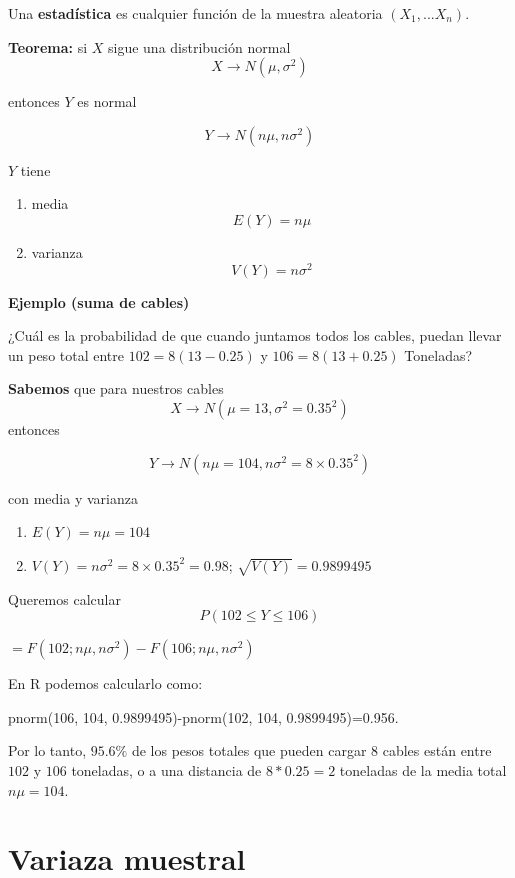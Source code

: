 \documentclass[
]{book}
\providecommand{\tightlist}{%
  \setlength{\itemsep}{0pt}\setlength{\parskip}{0pt}}
\begin{document}
Una \textbf{estadística} es cualquier función de la muestra aleatoria \((X_1, ... X_n)\).

\textbf{Teorema:} si \(X\) sigue una distribución normal
\[X \rightarrow N(\mu, \sigma^2)\]

entonces \(Y\) es normal

\[Y \rightarrow N(n\mu, n\sigma^2)\]

\(Y\) tiene

\begin{enumerate}
\def\labelenumi{\arabic{enumi})}
\tightlist
\item
  media \[E(Y)=n\mu\]
\item
  varianza \[V(Y)=n\sigma^2\]
\end{enumerate}

\textbf{Ejemplo (suma de cables)}

¿Cuál es la probabilidad de que cuando juntamos todos los cables, puedan llevar un peso total entre \(102=8(13 - 0.25)\) y \(106=8(13+ 0.25)\) Toneladas?

\textbf{Sabemos} que para nuestros cables \[X \rightarrow N(\mu=13, \sigma^2=0.35^2)\] entonces

\[Y \rightarrow N(n\mu=104, n\sigma^2=8\times 0.35^2)\]

con media y varianza

\begin{enumerate}
\def\labelenumi{\arabic{enumi})}
\tightlist
\item
  \(E(Y)=n\mu=104\)
\item
  \(V(Y)=n\sigma^2=8\times 0.35^2=0.98\); \(\sqrt{V(Y)}=0.9899495\)
\end{enumerate}

Queremos calcular \[P(102 \leq Y \leq 106)\]

\(=F(102; n\mu, n\sigma^2)-F(106; n\mu, n\sigma^2)\)

En R podemos calcularlo como:

pnorm(106, 104, 0.9899495)-pnorm(102, 104, 0.9899495)=0.956.

Por lo tanto, \(95.6\%\) de los pesos totales que pueden cargar \(8\) cables están entre \(102\) y \(106\) toneladas, o a una distancia de \(8*0.25=2\) toneladas de la media total \(n\mu=104\).

\hypertarget{variaza-muestral}{%
\section{Variaza muestral}\label{variaza-muestral}}
\end{document}
